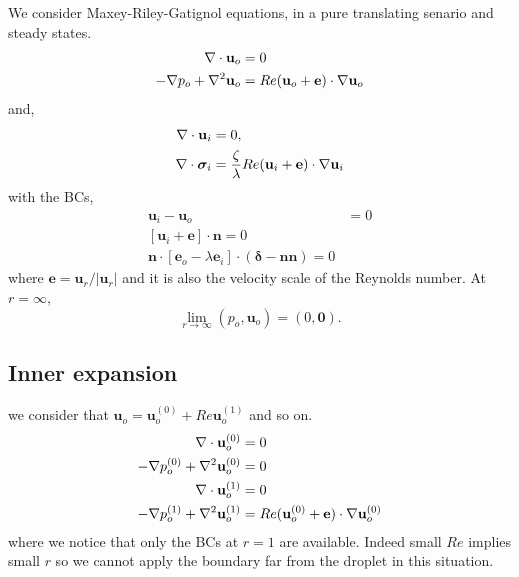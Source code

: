 We consider Maxey-Riley-Gatignol equations, in a pure translating senario and steady states.
\begin{align}
    \mathbf{\nabla}\cdot \textbf{u}_{o} &= 0
    \\
    -\mathbf{\nabla} p_o + \mathbf{\nabla}^2 \textbf{u}_o
    &=
    Re  (\textbf{u}_o + \textbf{e})\cdot \mathbf{\nabla} \textbf{u}_{o}
\end{align}
and,
\begin{align}
    \mathbf{\nabla}\cdot \textbf{u}_{i} &= 0,
    \\
    \mathbf{\nabla}\cdot\bm\sigma_{i}
    &=
    \frac{\zeta}{\lambda}Re  (\textbf{u}_{i} + \textbf{e}) \cdot \mathbf{\nabla} \textbf{u}_{i}
\end{align}
with the BCs,
\begin{align}
    \textbf{u}_i - \textbf{u}_o &= 0\\
    [\textbf{u}_i + \textbf{e}]\cdot \textbf{n} = 0 \\
    \textbf{n}\cdot [\textbf{e}_o - \lambda \textbf{e}_i ]\cdot (\bm\delta - \textbf{nn}) = 0
\end{align}
where $\textbf{e} = \textbf{u}_r / |\textbf{u}_r|$ and it is also the velocity scale of the Reynolds number.
At $r = \infty$,
\begin{equation}
    \lim_{r\to\infty} (p_o,\textbf{u}_o) = (0,\textbf{0}).
\end{equation}
\subsection{Inner expansion}
we consider that $\textbf{u}_o = \textbf{u}_o^{(0)} + Re \textbf{u}_o^{(1)}$ and so on.
\begin{align}
    \mathbf{\nabla}\cdot \textbf{u}_o^{(0)} &= 0
    \\
    -\mathbf{\nabla} p_o^{(0)} + \mathbf{\nabla}^2 \textbf{u}_o^{(0)}
    &= 0\\
    \mathbf{\nabla}\cdot \textbf{u}_o^{(1)} &= 0
    \\
    -\mathbf{\nabla} p_o^{(1)} + \mathbf{\nabla}^2 \textbf{u}_o^{(1)}
    &=
    Re  (\textbf{u}_o^{(0)} + \textbf{e})\cdot \mathbf{\nabla} \textbf{u}_o^{(0)}\\
\end{align}
where we notice that only the BCs at $r= 1$ are available.
Indeed small $Re$ implies small $r$ so we cannot apply the boundary far from the droplet in this situation.
